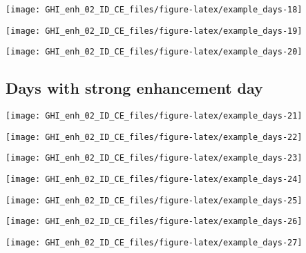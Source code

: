 \documentclass[
  10pt,
  a4paper,oneside]{article}
\begin{document}
\begin{center}\texttt{[image: GHI\_enh\_02\_ID\_CE\_files/figure-latex/example\_days-18]} \end{center}

\begin{center}\texttt{[image: GHI\_enh\_02\_ID\_CE\_files/figure-latex/example\_days-19]} \end{center}

\begin{center}\texttt{[image: GHI\_enh\_02\_ID\_CE\_files/figure-latex/example\_days-20]} \end{center}

\FloatBarrier

\hypertarget{days-with-strong-enhancement-day}{%
\subsection{Days with strong enhancement day}\label{days-with-strong-enhancement-day}}

\begin{center}\texttt{[image: GHI\_enh\_02\_ID\_CE\_files/figure-latex/example\_days-21]} \end{center}

\begin{center}\texttt{[image: GHI\_enh\_02\_ID\_CE\_files/figure-latex/example\_days-22]} \end{center}

\begin{center}\texttt{[image: GHI\_enh\_02\_ID\_CE\_files/figure-latex/example\_days-23]} \end{center}

\begin{center}\texttt{[image: GHI\_enh\_02\_ID\_CE\_files/figure-latex/example\_days-24]} \end{center}

\begin{center}\texttt{[image: GHI\_enh\_02\_ID\_CE\_files/figure-latex/example\_days-25]} \end{center}

\begin{center}\texttt{[image: GHI\_enh\_02\_ID\_CE\_files/figure-latex/example\_days-26]} \end{center}

\begin{center}\texttt{[image: GHI\_enh\_02\_ID\_CE\_files/figure-latex/example\_days-27]} \end{center}
\end{document}
